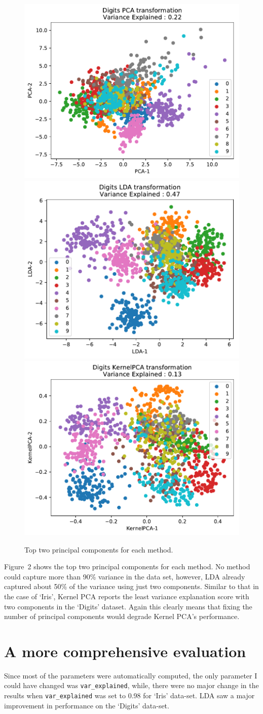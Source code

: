 \documentclass[12pt]{article}
\begin{document}
\begin{figure}
\begin{minipage}{\linewidth}
\includegraphics[width=0.32\linewidth]{Digits_PCA_top_two_components_.pdf}
\includegraphics[width=0.32\linewidth]{Digits_LDA_top_two_components_.pdf}
\includegraphics[width=0.32\linewidth]{Digits_KernelPCA_top_two_components_.pdf}
\end{minipage}
\caption{Top two principal components for each method.}
\end{figure}

Figure~2 shows the top two principal components for each method. No method could capture more than 90\% variance in the data set, however, LDA already captured about 50\% of the variance using just two components. Similar to that in the case of `Iris', Kernel PCA reports the least variance explanation score with two components in the `Digits' dataset.  Again this clearly means that fixing the number of principal components would degrade Kernel PCA's performance.

\section*{A more comprehensive evaluation}

Since most of the parameters were automatically computed, the only parameter I could have changed was \texttt{var\_explained}, while, there were no major change in the results when \texttt{var\_explained} was set to 0.98 for `Iris' data-set. LDA saw a major improvement in performance on the `Digits' data-set.
\end{document}
